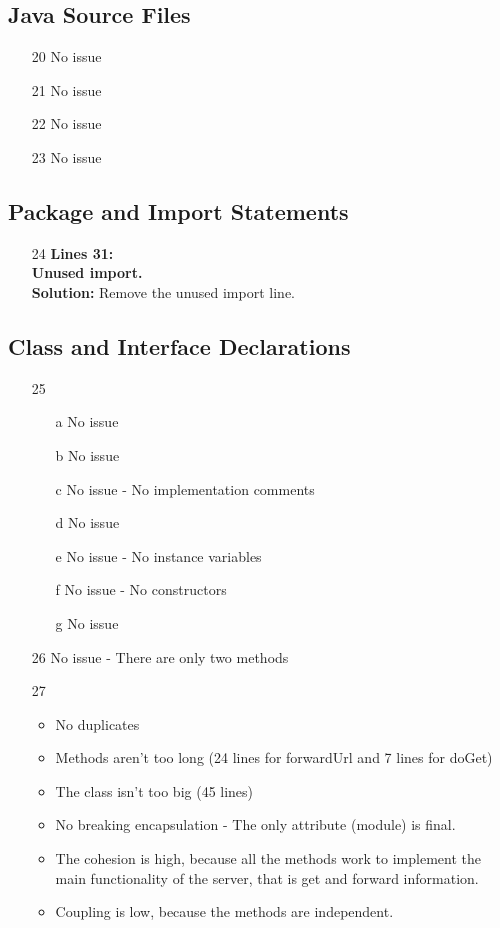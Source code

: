 \subsection{Java Source Files}
\begin{itemize}
\item[20] No issue
\item[21] No issue
\item[22] No issue
\item[23] No issue
\end{itemize}
\subsection{Package and Import Statements}
\begin{itemize}
	\item[24] \textbf{Lines 31:}\\
	\textbf{Unused import.}\\
	\textbf{Solution: } Remove the unused import line.
	
\end{itemize}
\subsection{Class and Interface Declarations}
\begin{itemize}
\item[25]
\begin{itemize}
\item[a] No issue
\item[b] No issue
\item[c] No issue - No implementation comments
\item[d] No issue
\item[e] No issue - No instance variables
\item[f] No issue - No constructors
\item[g] No issue
\end{itemize}
\item[26] No issue - There are only two methods
\item[27]
\begin{itemize}
\item No duplicates
\item Methods aren't too long (24 lines for forwardUrl and 7 lines for doGet)
\item The class isn't too big (45 lines)
\item No breaking encapsulation - The only attribute (module) is final.
\item The cohesion is high, because all the methods work to implement the main functionality of the server, that is get and forward information.
\item Coupling is low, because the methods are independent.
\end{itemize}
\end{itemize}

